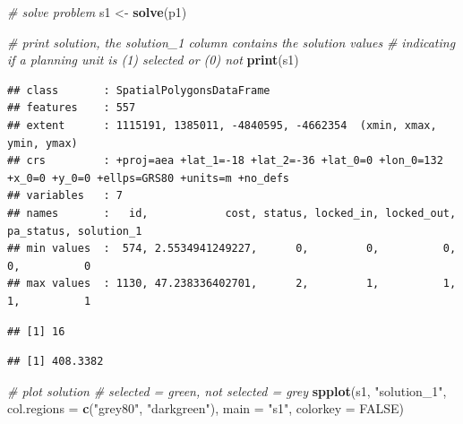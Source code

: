 \documentclass[12pt,]{book}
\newenvironment{Shaded}{\begin{snugshade}}{\end{snugshade}}
\newcommand{\KeywordTok}[1]{\textcolor[rgb]{0.13,0.29,0.53}{\textbf{#1}}}
\newcommand{\DataTypeTok}[1]{\textcolor[rgb]{0.13,0.29,0.53}{#1}}
\newcommand{\DecValTok}[1]{\textcolor[rgb]{0.00,0.00,0.81}{#1}}
\newcommand{\StringTok}[1]{\textcolor[rgb]{0.31,0.60,0.02}{#1}}
\newcommand{\CommentTok}[1]{\textcolor[rgb]{0.56,0.35,0.01}{\textit{#1}}}
\newcommand{\OtherTok}[1]{\textcolor[rgb]{0.56,0.35,0.01}{#1}}
\newcommand{\OperatorTok}[1]{\textcolor[rgb]{0.81,0.36,0.00}{\textbf{#1}}}
\newcommand{\NormalTok}[1]{#1}
\begin{document}
\begin{Shaded}
\begin{Highlighting}[]
\CommentTok{# solve problem}
\NormalTok{s1 <-}\StringTok{ }\KeywordTok{solve}\NormalTok{(p1)}

\CommentTok{# print solution, the solution_1 column contains the solution values}
\CommentTok{# indicating if a planning unit is (1) selected or (0) not}
\KeywordTok{print}\NormalTok{(s1)}
\end{Highlighting}
\end{Shaded}

\begin{verbatim}
## class       : SpatialPolygonsDataFrame 
## features    : 557 
## extent      : 1115191, 1385011, -4840595, -4662354  (xmin, xmax, ymin, ymax)
## crs         : +proj=aea +lat_1=-18 +lat_2=-36 +lat_0=0 +lon_0=132 +x_0=0 +y_0=0 +ellps=GRS80 +units=m +no_defs 
## variables   : 7
## names       :   id,            cost, status, locked_in, locked_out, pa_status, solution_1 
## min values  :  574, 2.5534941249227,      0,         0,          0,         0,          0 
## max values  : 1130, 47.238336402701,      2,         1,          1,         1,          1
\end{verbatim}

\begin{Shaded}
\end{Shaded}

\begin{verbatim}
## [1] 16
\end{verbatim}

\begin{Shaded}
\end{Shaded}

\begin{verbatim}
## [1] 408.3382
\end{verbatim}

\begin{Shaded}
\begin{Highlighting}[]
\CommentTok{# plot solution}
\CommentTok{# selected = green, not selected = grey}
\KeywordTok{spplot}\NormalTok{(s1, }\StringTok{"solution_1"}\NormalTok{, }\DataTypeTok{col.regions =} \KeywordTok{c}\NormalTok{(}\StringTok{"grey80"}\NormalTok{, }\StringTok{"darkgreen"}\NormalTok{), }\DataTypeTok{main =} \StringTok{"s1"}\NormalTok{,}
       \DataTypeTok{colorkey =} \OtherTok{FALSE}\NormalTok{)}
\end{Highlighting}
\end{Shaded}
\end{document}
